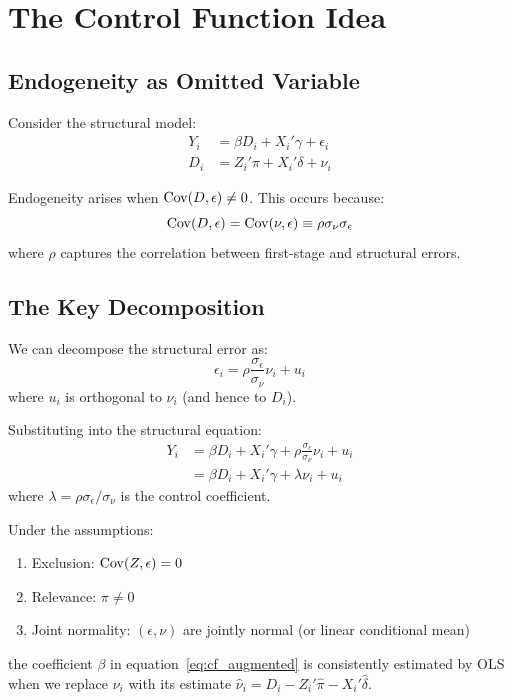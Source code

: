\section{The Control Function Idea}
\label{sec:cf_intuition}

\subsection{Endogeneity as Omitted Variable}

Consider the structural model:
\begin{align}
Y_i &= \beta D_i + X_i'\gamma + \epsilon_i \label{eq:cf_structural} \\
D_i &= Z_i'\pi + X_i'\delta + \nu_i \label{eq:cf_first_stage}
\end{align}

Endogeneity arises when $\mathrm{Cov}(D, \epsilon) \neq 0$. This occurs because:
\[
\mathrm{Cov}(D, \epsilon) = \mathrm{Cov}(\nu, \epsilon) \equiv \rho \sigma_\nu \sigma_\epsilon
\]
where $\rho$ captures the correlation between first-stage and structural errors.

\subsection{The Key Decomposition}

We can decompose the structural error as:
\begin{equation}
\epsilon_i = \rho \frac{\sigma_\epsilon}{\sigma_\nu} \nu_i + u_i
\label{eq:cf_decomposition}
\end{equation}
where $u_i$ is orthogonal to $\nu_i$ (and hence to $D_i$).

Substituting into the structural equation:
\begin{align}
Y_i &= \beta D_i + X_i'\gamma + \rho \frac{\sigma_\epsilon}{\sigma_\nu} \nu_i + u_i \\
&= \beta D_i + X_i'\gamma + \lambda \nu_i + u_i
\label{eq:cf_augmented}
\end{align}
where $\lambda = \rho \sigma_\epsilon / \sigma_\nu$ is the control coefficient.

\begin{theorem}
\label{thm:cf_identification}
Under the assumptions:
\begin{enumerate}
    \item Exclusion: $\mathrm{Cov}(Z, \epsilon) = 0$
    \item Relevance: $\pi \neq 0$
    \item Joint normality: $(\epsilon, \nu)$ are jointly normal (or linear conditional mean)
\end{enumerate}
the coefficient $\beta$ in equation~\eqref{eq:cf_augmented} is consistently estimated by OLS when we replace $\nu_i$ with its estimate $\hat{\nu}_i = D_i - Z_i'\hat{\pi} - X_i'\hat{\delta}$.
\end{theorem}

